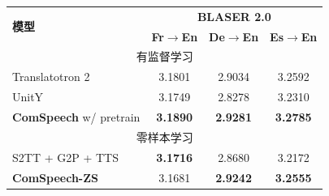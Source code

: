 \begin{table}[!htbp]
    \label{tab:comspeech_blaser}
    \centering
    \small
    \begin{tabular}{lccc}
        \toprule
        \multirow{2}{*}{\textbf{模型}} & \multicolumn{3}{c}{\textbf{BLASER 2.0}} \\
        & \textbf{Fr$\rightarrow$En} & \textbf{De$\rightarrow$En} & \textbf{Es$\rightarrow$En} \\
        \midrule
        \multicolumn{4}{c}{{有监督学习}} \\
        \midrule
        Translatotron 2 \citep{translatotron2} & 3.1801 & 2.9034 & 3.2592 \\
        UnitY \citep{inaguma-etal-2023-unity} & 3.1749 & 2.8278 & 3.2310 \\
        \textbf{ComSpeech} w/ pretrain & \textbf{3.1890} & \textbf{2.9281} & \textbf{3.2785} \\
        \midrule
        \multicolumn{4}{c}{{零样本学习}} \\
        \midrule
        S2TT + G2P + TTS & \textbf{3.1716} & 2.8680 & 3.2172 \\
        \textbf{ComSpeech-ZS} & 3.1681 & \textbf{2.9242} & \textbf{3.2555} \\
        \bottomrule
    \end{tabular}
\end{table}
